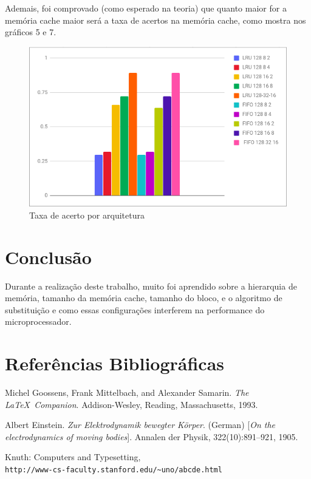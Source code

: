 \documentclass[conference]{IEEEtran}
\begin{document}
Ademais, foi comprovado (como esperado na teoria) que quanto maior for a memória cache maior será a taxa de acertos na memória cache, como mostra nos gráficos 5 e 7.

\begin{figure}[H]
    \includegraphics[width=\linewidth]{Imagens/HIT_RATE_POR_ARQUITETURA.png}
    \caption{Taxa de acerto por arquitetura}
    \label{fig:Taxa de acerto por arquitetura}
\end{figure}



\section{Conclusão}

Durante a realização deste trabalho, muito foi aprendido sobre a hierarquia de memória, tamanho da memória cache, tamanho do bloco, e o algoritmo de substituição e como essas configurações interferem na performance do microprocessador. 

\section{Referências Bibliográficas}

\begin{thebibliography}{9}
Michel Goossens, Frank Mittelbach, and Alexander Samarin. 
\textit{The \LaTeX\ Companion}. 
Addison-Wesley, Reading, Massachusetts, 1993.

Albert Einstein. 
\textit{Zur Elektrodynamik bewegter K{\"o}rper}. (German) 
[\textit{On the electrodynamics of moving bodies}]. 
Annalen der Physik, 322(10):891–921, 1905.

Knuth: Computers and Typesetting,
\\\texttt{http://www-cs-faculty.stanford.edu/\~{}uno/abcde.html}
\end{thebibliography}
\end{document}
